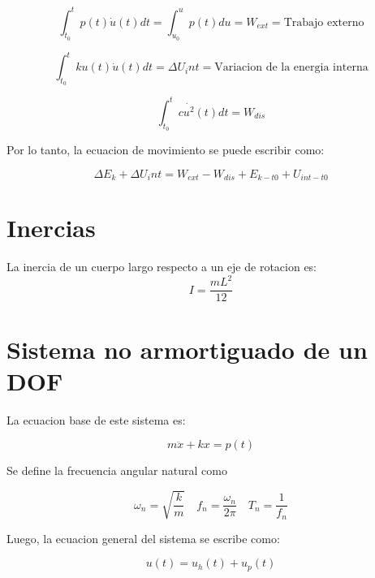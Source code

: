 \documentclass{article}  %
\begin{document}
\begin{equation}
    \int_{t_0}^{t} p(t) \dot{u}(t) dt = \int_{u_0}^{u} p(t) du = W_{ext} = \text{Trabajo externo}
\end{equation}

\begin{equation}
    \int_{t_0}^{t} k u(t) \dot{u}(t) dt = \Delta U_int = \text{Variacion de la energia interna}
\end{equation}

\begin{equation}
    \int_{t_0}^{t} c \dot{u^2}(t) dt = W_{dis}
\end{equation}

Por lo tanto, la ecuacion de movimiento se puede escribir como:

\begin{equation}
   \Delta E_k + \Delta U_int= W_{ext} - W_{dis} + {E_{k-t0} + U_{int-t0}} 
\end{equation}


\section{Inercias}

La inercia de un cuerpo largo respecto a un eje de rotacion es:
\begin{equation}
    I = \frac{mL^2}{12}
\end{equation}



\newpage
\section{Sistema no armortiguado de un DOF}

La ecuacion base de este sistema es:

\begin{equation}
    m \ddot{x} + kx = p(t)
\end{equation}

Se define la frecuencia angular natural como

\begin{equation}
    \omega_n = \sqrt{\frac{k}{m}} \quad f_n = \frac{\omega_n}{2\pi} \quad T_n = \frac{1}{f_n} 
\end{equation}

Luego, la ecuacion general del sistema se escribe como:

\begin{equation}
    u(t) = u_h(t) + u_p(t)
\end{equation}
\end{document}
